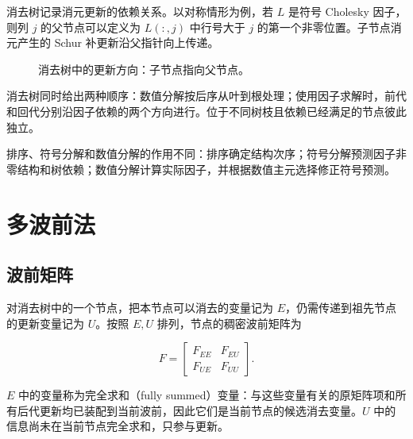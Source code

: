 消去树记录消元更新的依赖关系。以对称情形为例，若 $L$ 是符号 Cholesky 因子，则列 $j$ 的父节点可以定义为 $L(:,j)$ 中行号大于 $j$ 的第一个非零位置。子节点消元产生的 Schur 补更新沿父指针向上传递。

\begin{figure}[htbp]
\centering
{}
\caption{消去树中的更新方向：子节点指向父节点。}
\label{fig:elim-tree}
\end{figure}

消去树同时给出两种顺序：数值分解按后序从叶到根处理；使用因子求解时，前代和回代分别沿因子依赖的两个方向进行。位于不同树枝且依赖已经满足的节点彼此独立。

排序、符号分解和数值分解的作用不同：排序确定结构次序；符号分解预测因子非零结构和树依赖；数值分解计算实际因子，并根据数值主元选择修正符号预测。

\section{多波前法}

\subsection{波前矩阵}

对消去树中的一个节点，把本节点可以消去的变量记为 $E$，仍需传递到祖先节点的更新变量记为 $U$。按照 $E,U$ 排列，节点的稠密波前矩阵为

\[
F=
\begin{bmatrix}
F_{EE}&F_{EU}\\
F_{UE}&F_{UU}
\end{bmatrix}.
\]

$E$ 中的变量称为完全求和（fully summed）变量：与这些变量有关的原矩阵项和所有后代更新均已装配到当前波前，因此它们是当前节点的候选消去变量。$U$ 中的信息尚未在当前节点完全求和，只参与更新。

